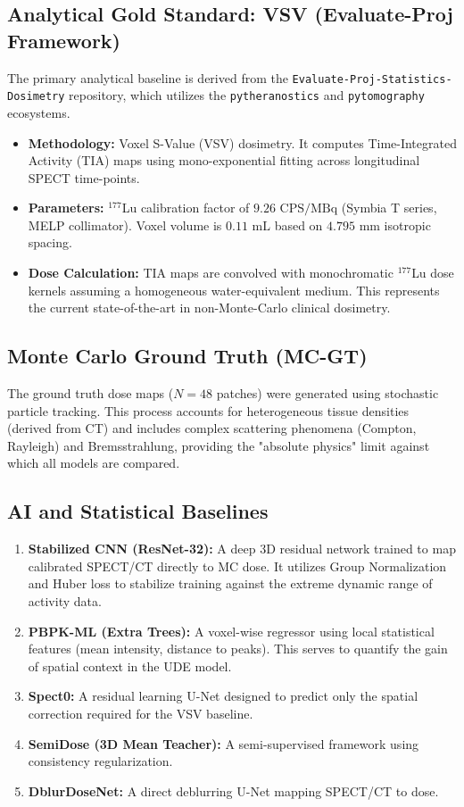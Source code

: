 \documentclass[11pt,a4paper]{article}
\begin{document}
\subsection{Analytical Gold Standard: VSV (Evaluate-Proj Framework)}
The primary analytical baseline is derived from the \texttt{Evaluate-Proj-Statistics-Dosimetry} repository, which utilizes the \texttt{pytheranostics} and \texttt{pytomography} ecosystems. 
\begin{itemize}
    \item \textbf{Methodology:} Voxel S-Value (VSV) dosimetry. It computes Time-Integrated Activity (TIA) maps using mono-exponential fitting across longitudinal SPECT time-points.
    \item \textbf{Parameters:} $^{177}$Lu calibration factor of $9.26 \text{ CPS/MBq}$ (Symbia T series, MELP collimator). Voxel volume is $0.11 \text{ mL}$ based on $4.795 \text{ mm}$ isotropic spacing.
    \item \textbf{Dose Calculation:} TIA maps are convolved with monochromatic $^{177}$Lu dose kernels assuming a homogeneous water-equivalent medium. This represents the current state-of-the-art in non-Monte-Carlo clinical dosimetry.
\end{itemize}

\subsection{Monte Carlo Ground Truth (MC-GT)}
The ground truth dose maps ($N=48$ patches) were generated using stochastic particle tracking. This process accounts for heterogeneous tissue densities (derived from CT) and includes complex scattering phenomena (Compton, Rayleigh) and Bremsstrahlung, providing the "absolute physics" limit against which all models are compared.

\subsection{AI and Statistical Baselines}
\begin{enumerate}
    \item \textbf{Stabilized CNN (ResNet-32):} A deep 3D residual network trained to map calibrated SPECT/CT directly to MC dose. It utilizes Group Normalization and Huber loss to stabilize training against the extreme dynamic range of activity data.
    \item \textbf{PBPK-ML (Extra Trees):} A voxel-wise regressor using local statistical features (mean intensity, distance to peaks). This serves to quantify the gain of spatial context in the UDE model.
    \item \textbf{Spect0:} A residual learning U-Net designed to predict only the spatial correction required for the VSV baseline.
    \item \textbf{SemiDose (3D Mean Teacher):} A semi-supervised framework using consistency regularization.
    \item \textbf{DblurDoseNet:} A direct deblurring U-Net mapping SPECT/CT to dose.
\end{enumerate}
\end{document}
